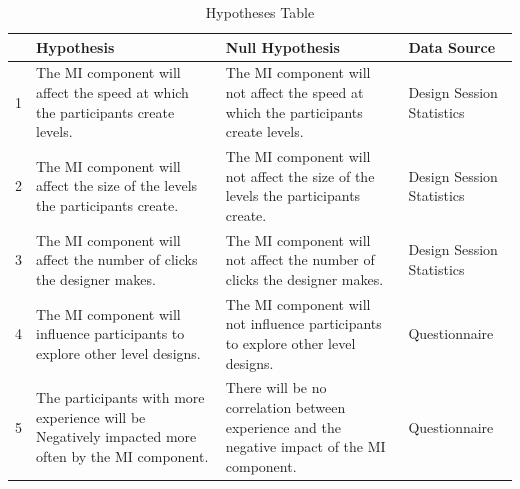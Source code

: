 \documentclass[journal]{IEEEtran}
\begin{document}
\begin{table}[h]
		\centering
		\caption{Hypotheses Table}
		\label{hyp}
		\def\arraystretch{1.5}
		\begin{tabular}{|c|p{7cm}|p{7cm}|p{1.75cm}|}
			\hline
			& \textbf{Hypothesis}& \textbf{Null Hypothesis} & \textbf{Data Source}\\\hline
			1 & The MI component will affect the speed at which the participants create levels.
			& The MI component will not affect the speed at which the participants create levels.
			& Design Session Statistics\\ \hline
			
			2 & The MI component will affect the size of the levels the participants create.
			& The MI component will not affect the size of the levels the participants create.
			& Design Session Statistics\\ \hline

			3 & The MI component will affect the number of clicks the designer makes.
			& The MI component will not affect the number of clicks the designer makes.
			& Design Session Statistics\\ \hline

			4 & The MI component will influence participants to explore other level designs.
			& The MI component will not influence participants to explore other level designs.
			& Questionnaire\\ \hline

		      5 & The participants with more experience will be Negatively impacted more often by the MI component.
			&  There will be no correlation between experience and the negative impact of the MI component.
			& Questionnaire\\ \hline
			
		\end{tabular}
\end{table}
\end{document}
